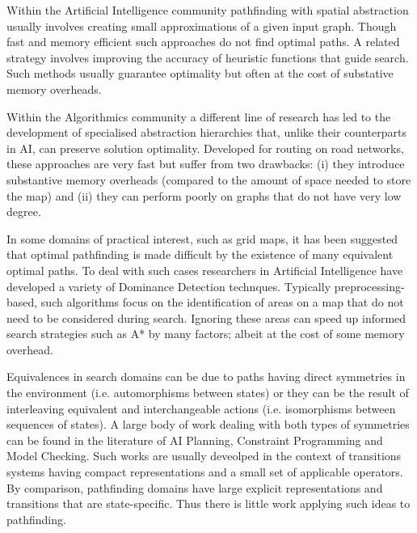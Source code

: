 Within the Artificial Intelligence community pathfinding with spatial abstraction usually involves
creating small approximations of a given input graph.  Though fast and memory efficient such
approaches do not find optimal paths.  A related strategy involves improving the accuracy of 
heuristic functions that guide search. Such methods usually guarantee optimality but often at the 
cost of substative memory overheads.  

Within the Algorithmics community a different line of research has led to the development of 
specialised abstraction hierarchies that, unlike their counterparts in AI, can preserve solution 
optimality. Developed for routing on road networks, these approaches are
very fast but suffer from two drawbacks: (i) they introduce substantive memory overheads 
(compared to the amount of space needed to store the map) and (ii) they can perform poorly on 
graphs that do not have very low degree.

In some domains of practical interest, such as grid maps, it has been suggested that optimal
pathfinding is made difficult by the existence of many equivalent optimal paths. To deal
with such cases researchers in Artificial Intelligence have developed a variety of 
Dominance Detection technques.  Typically preprocessing-based, such algorithms focus on the 
identification of areas on a map that do not need to be considered during search. Ignoring 
these areas can speed up informed search strategies such as A* by many factors; albeit at the 
cost of some memory overhead.

Equivalences in search domains can be due to paths having direct symmetries in the environment (i.e.
automorphisms between states) or they can be the result of interleaving equivalent and
interchangeable actions (i.e. isomorphisms between sequences of states). A large body of work
dealing with both types of symmetries can be found in the literature of AI Planning, Constraint
Programming and Model Checking. Such works are usually deveolped in the context of transitions
systems having compact representations and a small set of applicable operators. By comparison,
pathfinding domains have large explicit representations and transitions that are state-specific.
Thus there is little work applying such ideas to pathfinding.

